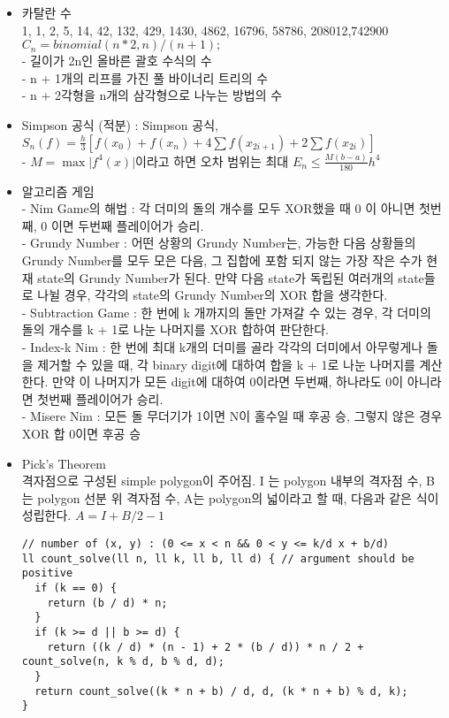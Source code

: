 \documentclass[landscape, 8pt, a4paper, twocolumn]{extarticle} %
\begin{document}
{}{}{}{}{}
\begin{itemize}
\setlength\itemsep{0.1em}
    
\item 카탈란 수\\
1, 1, 2, 5, 14, 42, 132, 429, 1430, 4862, 16796, 58786, 208012,742900\\
$C_n = binomial(n * 2, n) / (n + 1);$\\
- 길이가 2n인 올바른 괄호 수식의 수\\
- n + 1개의 리프를 가진 풀 바이너리 트리의 수\\
- n + 2각형을 n개의 삼각형으로 나누는 방법의 수

\item Simpson 공식 (적분) : Simpson 공식, $S_n(f) = \frac{h}{3}[f(x_0)+f(x_n)+ 4\sum f(x_{2i+1}) + 2\sum f(x_{2i})]$\\
- $M = \max \vert f^4(x) \vert$이라고 하면 오차 범위는 최대 $E_n \leq \frac{M(b-a)}{180}h^4$

\item 알고리즘 게임\\
- Nim Game의 해법 : 각 더미의 돌의 개수를 모두 XOR했을 때 0 이 아니면 첫번째, 0 이면 두번째 플레이어가 승리.\\
- Grundy Number : 어떤 상황의 Grundy Number는, 가능한 다음 상황들의 Grundy Number를 모두 모은 다음, 그 집합에 포함 되지 않는 가장 작은 수가 현재 state의 Grundy Number가 된다. 만약 다음 state가 독립된 여러개의 state들로 나뉠 경우, 각각의 state의 Grundy Number의 XOR 합을 생각한다.\\
- Subtraction Game : 한 번에 k 개까지의 돌만 가져갈 수 있는 경우, 각 더미의 돌의 개수를 k + 1로 나눈 나머지를 XOR 합하여 판단한다.\\
- Index-k Nim : 한 번에 최대 k개의 더미를 골라 각각의 더미에서 아무렇게나 돌을 제거할 수 있을 때, 각 binary digit에 대하여 합을 k + 1로 나눈 나머지를 계산한다. 만약 이 나머지가 모든 digit에 대하여 0이라면 두번째, 하나라도 0이 아니라면 첫번째 플레이어가 승리.\\
- Misere Nim : 모든 돌 무더기가 1이면 N이 홀수일 때 후공 승, 그렇지 않은 경우 XOR 합 0이면 후공 승

\item Pick’s Theorem\\
격자점으로 구성된 simple polygon이 주어짐. I 는 polygon 내부의 격자점 수, B 는 polygon 선분 위 격자점 수, A는 polygon의 넓이라고 할 때, 다음과 같은 식이 성립한다. $A=I+B/2-1$
\begin{verbatim}
// number of (x, y) : (0 <= x < n && 0 < y <= k/d x + b/d)
ll count_solve(ll n, ll k, ll b, ll d) { // argument should be positive
  if (k == 0) {
    return (b / d) * n;
  }
  if (k >= d || b >= d) {
    return ((k / d) * (n - 1) + 2 * (b / d)) * n / 2 + count_solve(n, k % d, b % d, d);
  }
  return count_solve((k * n + b) / d, d, (k * n + b) % d, k);
}
\end{verbatim}


\end{itemize}
\end{document}
